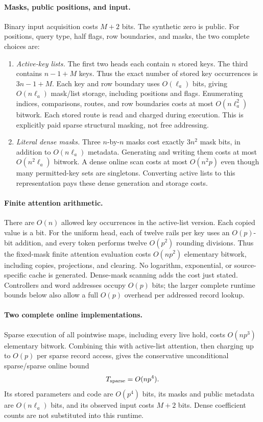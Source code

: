 \paragraph{Masks, public positions, and input.}
Binary input acquisition costs $M+2$ bits. The synthetic zero is public.
For positions, query type, half flags, row boundaries, and masks, the two
complete choices are:
\begin{enumerate}
\item \emph{Active-key lists.} The first two heads each contain $n$
 stored keys. The third contains $n-1+M$ keys. Thus the exact number of
 stored key occurrences is $3n-1+M$. Each key and row boundary uses
 $O(\ell_a)$ bits, giving $O(n\ell_a)$ mask/list storage, including
 positions and flags. Enumerating indices, comparisons, routes, and row
 boundaries costs at most $O(n\ell_a^2)$ bitwork. Each stored route is
 read and charged during execution. This is explicitly paid sparse
 structural masking, not free addressing.
\item \emph{Literal dense masks.} Three $n$-by-$n$ masks cost exactly
 $3n^2$ mask bits, in addition to $O(n\ell_a)$ metadata. Generating and
 writing them costs at most $O(n^2\ell_a)$ bitwork. A dense online scan
 costs at most $O(n^2p)$ even though many permitted-key sets are
 singletons. Converting active lists to this representation pays these
 dense generation and storage costs.
\end{enumerate}

\paragraph{Finite attention arithmetic.}
There are $O(n)$ allowed key occurrences in the active-list version.
Each copied value is a bit. For the uniform head, each of twelve rails
per key uses an $O(p)$-bit addition, and every token performs twelve
$O(p^2)$ rounding divisions. Thus the fixed-mask finite attention
evaluation costs $O(np^2)$ elementary bitwork, including copies,
projections, and clearing. No logarithm, exponential, or source-specific
cache is generated. Dense-mask scanning adds the cost just stated.
Controllers and word addresses occupy $O(p)$ bits; the larger complete
runtime bounds below also allow a full $O(p)$ overhead per addressed
record lookup.

\paragraph{Two complete online implementations.}
Sparse execution of all pointwise maps, including every live hold, costs
$O(np^3)$ elementary bitwork. Combining this with active-list attention,
then charging up to $O(p)$ per sparse record access, gives the conservative
unconditional sparse/sparse online bound
\begin{equation}\label{eq:impl-sparse-work}
 T_{\rm sparse}=O(np^4).
\end{equation}
Its stored parameters and code are $O(p^4)$ bits, its masks and public
metadata are $O(n\ell_a)$ bits, and its observed input costs $M+2$ bits.
Dense coefficient counts are not substituted into this runtime.

